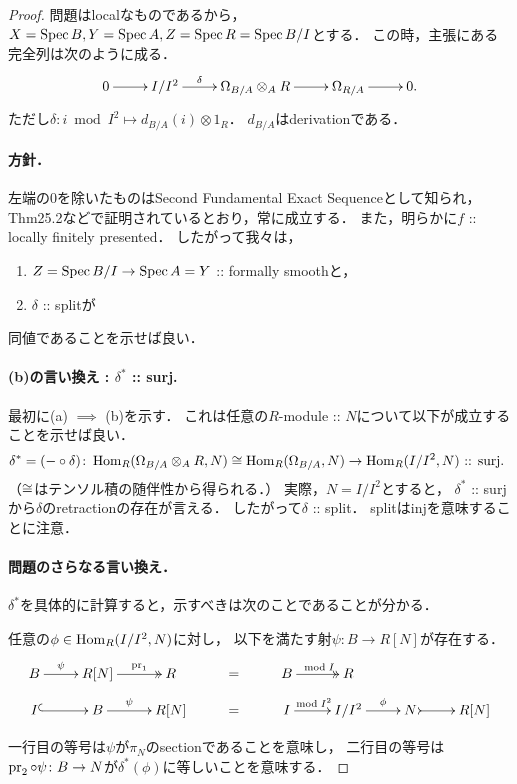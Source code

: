 \documentclass[a4paper, dvipdfmx]{jsarticle}
\begin{document}
\begin{proof}
    問題はlocalなものであるから，
    $X=\operatorname{Spec} B, Y=\operatorname{Spec} A, Z=\operatorname{Spec} R=\operatorname{Spec} B/I$とする．
    この時，主張にある完全列は次のように成る．
    \[\xymatrix{
            0 \ar[r]& I/I^2 \ar[r]^-{\delta}& \shDer_{B/A} \otimes_A R \ar[r]& \shDer_{R/A} \ar[r]& 0.
    }\]
    ただし$\delta \colon i \bmod I^2 \mapsto d_{B/A}(i) \otimes 1_R$．
    $d_{B/A}$はderivationである．

    \paragraph{方針．}
    左端の$0$を除いたものはSecond Fundamental Exact Sequenceとして知られ，
    \cite{Mat} Thm25.2などで証明されているとおり，常に成立する．
    また，明らかに$f$ :: locally finitely presented．
    したがって我々は，
    \begin{enumerate}[label=(\alph*), leftmargin=*]
        \item $Z=\operatorname{Spec} B/I \to \operatorname{Spec} A=Y$ :: formally smoothと，
        \item $\delta$ :: splitが
    \end{enumerate}
    同値であることを示せば良い．

    \paragraph{(b)の言い換え : $\delta^*$ :: surj.}
    最初に(a) $\implies$ (b)を示す．
    これは任意の$R$-module :: $N$について以下が成立することを示せば良い．
    \[
        \delta^*=(- \circ \delta) \colon
            \operatorname{Hom}_R(\Omega_{B/A} \otimes_A R, N) \cong \operatorname{Hom}_R(\Omega_{B/A}, N) \to \operatorname{Hom}_R(I/I^2, N)
            \text{ :: surj. }
    \]
    （$\cong$はテンソル積の随伴性から得られる．）
    実際，$N=I/I^2$とすると，
    $\delta^*$ :: surjから$\delta$のretractionの存在が言える．
    したがって$\delta$ :: split．
    splitはinjを意味することに注意．

    \paragraph{問題のさらなる言い換え．}
    $\delta^*$を具体的に計算すると，示すべきは次のことであることが分かる．
    \begin{Claim}
        任意の$\phi \in \operatorname{Hom}_R(I/I^2, N)$に対し，
        以下を満たす射$\psi \colon B \to R[N]$が存在する．
        \[\xymatrix@R=10pt{
                B \ar[r]^-{\psi}& R[N] \ar@{->>}[r]^-{\pr_1}& R & =
                    & B \ar@{->>}[r]^-{\bmod I}& R \\
                I \ar@{^{(}->}[r]& B \ar[r]^-{\psi}& R[N] & =
                    & I \ar[r]^-{\bmod I^2}& I/I^2 \ar[r]^-{\phi}& N \ar@{>->}[r]& R[N]
        }\]
    \end{Claim}
    一行目の等号は$\psi$が$\pi_N$のsectionであることを意味し，
    二行目の等号は$\operatorname{pr}_2 \circ \psi \colon B \to N$が$\delta^*(\phi)$に等しいことを意味する．


\end{proof}
\end{document}
